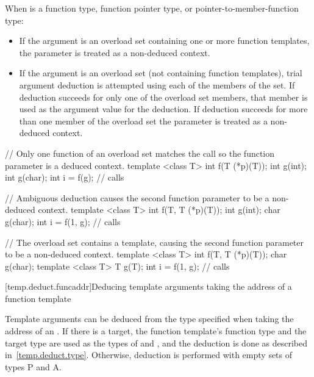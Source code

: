 \pnum
When
is a function type, function pointer type, or pointer-to-member-function type:
\begin{itemize}
\item
If the argument is an overload set containing one or more function templates,
the parameter is treated as a non-deduced context.
\item
If the argument is an overload set (not containing function templates), trial
argument deduction is attempted using each of the members of the set. If
deduction succeeds for only one of the overload set members, that member is
used as the argument value for the deduction. If deduction succeeds for more than
one member of the overload set the parameter is treated as a non-deduced context.
\end{itemize}

\pnum
\begin{example}
\begin{codeblock}
// Only one function of an overload set matches the call so the function parameter is a deduced context.
template <class T> int f(T (*p)(T));
int g(int);
int g(char);
int i = f(g);       // calls 
\end{codeblock}
\end{example}

\pnum
\begin{example}
\begin{codeblock}
// Ambiguous deduction causes the second function parameter to be a non-deduced context.
template <class T> int f(T, T (*p)(T));
int g(int);
char g(char);
int i = f(1, g);    // calls 
\end{codeblock}
\end{example}

\pnum
\begin{example}
\begin{codeblock}
// The overload set contains a template, causing the second function parameter to be a non-deduced context.
template <class T> int f(T, T (*p)(T));
char g(char);
template <class T> T g(T);
int i = f(1, g);    // calls 
\end{codeblock}
\end{example}

[temp.deduct.funcaddr]{Deducing template arguments taking the address of a function template}

\pnum
Template arguments can be deduced from the type specified when taking
the address of an .
If there is a target,
the function template's function type and the target type
are used as the types of
and
,
and the deduction is done as
described in~\ref{temp.deduct.type}.
Otherwise, deduction is performed with empty sets of types P and A.

